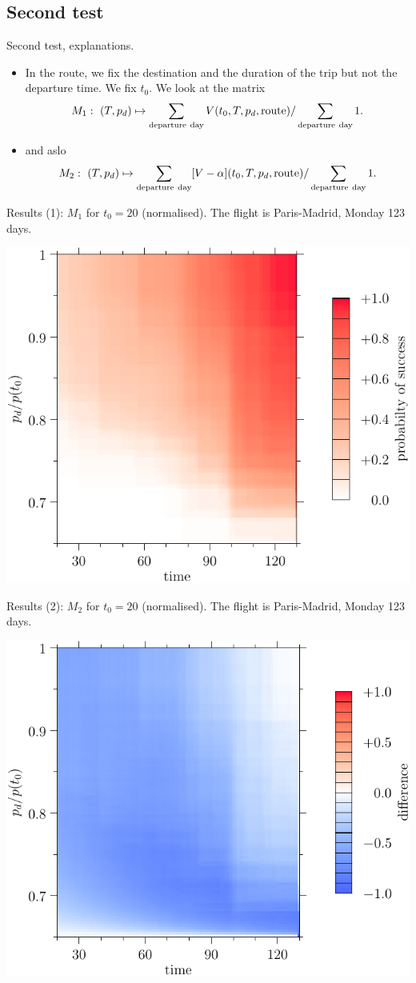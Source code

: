 \documentclass{beamer}
\begin{document}
\subsection{  Second test    }
\frame
{
Second test, explanations.\\
\begin{itemize}

\item In the route, we fix the destination and the duration of the trip but not the departure time.  We fix $t_0$. We look at the matrix
$$ M_1: \ (T,p_d) \mapsto \sum \limits_{ {\rm departure \ day} } V(t_0, T, p_d, {\rm route}) / \sum \limits_{ {\rm departure \ day} } 1.$$
\item and aslo
$$ M_2: \ (T,p_d) \mapsto \sum \limits_{ {\rm departure \ day} } [V-\alpha](t_0, T, p_d, {\rm route}) / \sum \limits_{ {\rm departure \ day} } 1.$$

\end{itemize}


}
\frame
{
Results (1): $M_1$ for $t_0=20$ (normalised). The flight is Paris-Madrid, Monday 123 days. 
\hspace{0.4cm}
\begin{center}
\includegraphics[width=8.cm]{res4.pdf}
\end{center}
\vspace{-0.4cm}
}

\frame
{
Results (2): $M_2$ for $t_0=20$ (normalised). The flight is Paris-Madrid, Monday 123 days. 
\hspace{0.4cm}
\begin{center}
\includegraphics[width=8.cm]{res5.pdf}
\end{center}
\vspace{-0.4cm}
}
\end{document}
